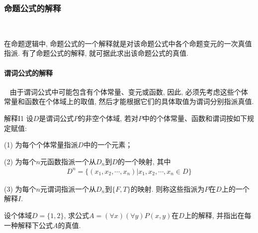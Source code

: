 \subsubsection{命题公式的解释}~{}

在命题逻辑中, 命题公式的一个解释就是对该命题公式中各个命题变元的一次真值指派. 有了命题公式的解释, 就可据此求出该命题公式的真值.
\paragraph{谓词公式的解释}~{}
由于谓词公式中可能包含有个体常量、变元或函数, 因此, 必须先考虑这些个体常量和函数在个体域上的取值, 然后才能根据它们的具体取值为谓词分别指派真值.

\begin{mydef}{解释I}{1}
设$D$是谓词公式$P$的非空个体域, 若对$P$中的个体常量、函数和谓词按如下规定赋值:

(1) 为每个个体常量指派$D$中的一个元素；

(2) 为每个$n$元函数指派一个从$D_n$到$D$的一个映射, 其中
\begin{align}
  D^n =\{(x_1, x_2,\cdots, x_n)| x_1, x_2, \cdots, x_n\in D\}
\end{align}

(3) 为每个$n$元谓词指派一个从$D_n$到$\{F, T\}$的映射.  则称这些指派为$P$在$D$上的一个解释$I$.
\end{mydef}
\begin{example}
  设个体域$D=\{1, 2\}$, 求公式$A=(\forall x)( \forall y)P(x, y)$在$D$上的解释, 并指出在每一种解释下公式$A$的真值.
\end{example}
